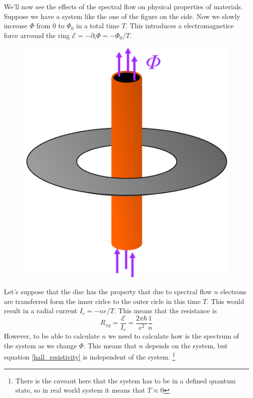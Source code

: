        We'll now see the effects of the spectral flow on physical properties of materials. Suppose we have a system like the one of the figure on the side. Now we slowly increase $\Phi$ from 0 to $\Phi_0$ in a total time $T$. This introduces a electromagnetice force arround the ring $\mathcal{E}=-\partial_t\Phi=-\Phi_0/T$.
        \begin{figure}
            \includegraphics[width=.4\textwidth]{Immagini/topo/disk-solenoid.pdf}
        \end{figure} 
    
        Let's suppose that the disc has the property that due to spectral flow $n$ electrons are transferred form the inner cirlce to the outer cicle in this time $T$. This would result in a radial current $I_r=-ne/T$. This means that the resistance is 
        \begin{equation} 
            \label{hall_resistivity}
                R_{xy}=\frac{\mathcal {E}}{I_r}=\frac{2\pi\hbar}{e^2}\frac 1n
        \end{equation}
        However, to be able to calculate $n$ we need to calculate how is the spectrum of the system as we change $\Phi$. This means that $n$ depends on the system, but equation \ref{hall_resistivity} is independent of the system. \footnote{There is the caveaut here that the system has to be in a defined quantum state, so in real world system it means that $T\approx0$}